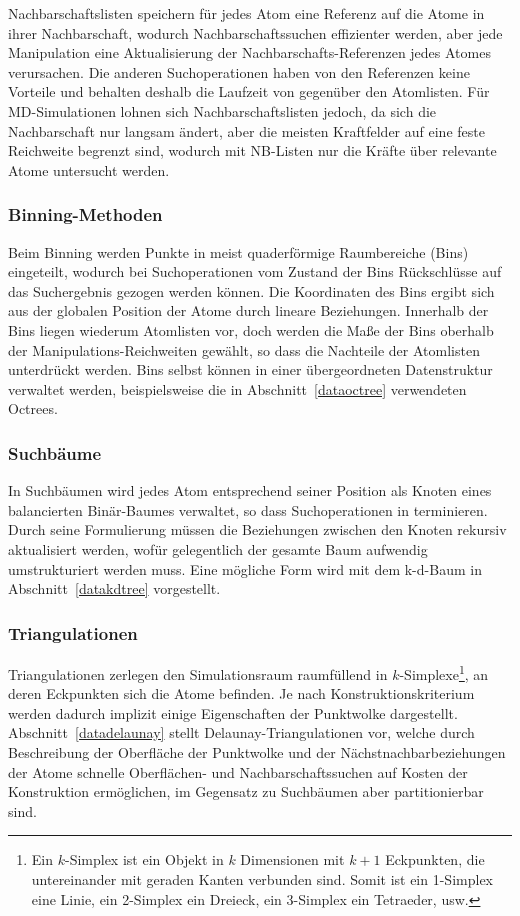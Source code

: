 Nachbarschaftslisten speichern für jedes Atom eine Referenz auf die Atome in ihrer Nachbarschaft, wodurch Nachbarschaftssuchen effizienter werden, aber jede Manipulation eine Aktualisierung der Nachbarschafts-Referenzen jedes Atomes verursachen.
Die anderen Suchoperationen haben von den Referenzen keine Vorteile und behalten deshalb die Laufzeit von  gegenüber den Atomlisten.
Für MD-Simulationen lohnen sich Nachbarschaftslisten jedoch, da sich die Nachbarschaft nur langsam ändert, aber die meisten Kraftfelder auf eine feste Reichweite begrenzt sind, wodurch mit NB-Listen nur die Kräfte über relevante Atome untersucht werden.

\subsubsection{Binning-Methoden}
Beim Binning werden Punkte in meist quaderförmige Raumbereiche (Bins) eingeteilt, wodurch bei Suchoperationen vom Zustand der Bins Rückschlüsse auf das Suchergebnis gezogen werden können.
Die Koordinaten des Bins ergibt sich aus der globalen Position der Atome durch lineare Beziehungen.
Innerhalb der Bins liegen wiederum Atomlisten vor, doch werden die Maße der Bins oberhalb der Manipulations-Reichweiten gewählt, so dass die Nachteile der Atomlisten unterdrückt werden.
Bins selbst können in einer übergeordneten Datenstruktur verwaltet werden, beispielsweise die in Abschnitt~\ref{dataoctree} verwendeten Octrees.

\subsubsection{Suchbäume}
In Suchbäumen wird jedes Atom entsprechend seiner Position als Knoten eines balancierten Binär-Baumes verwaltet, so dass Suchoperationen in  terminieren.
Durch seine Formulierung müssen die Beziehungen zwischen den Knoten rekursiv aktualisiert werden, wofür gelegentlich der gesamte Baum aufwendig umstrukturiert werden muss.
Eine mögliche Form wird mit dem k-d-Baum in Abschnitt~\ref{datakdtree} vorgestellt.

\subsubsection{Triangulationen}
Triangulationen zerlegen den Simulationsraum raumfüllend in $k$-Simplexe\footnote{Ein $k$-Simplex ist ein Objekt in $k$ Dimensionen mit $k+1$ Eckpunkten, die untereinander mit geraden Kanten verbunden sind.
  Somit ist ein 1-Simplex eine Linie, ein 2-Simplex ein Dreieck, ein 3-Simplex ein Tetraeder, usw.}, an deren Eckpunkten sich die Atome befinden.
Je nach Konstruktionskriterium werden dadurch implizit einige Eigenschaften der Punktwolke dargestellt.
Abschnitt~\ref{datadelaunay} stellt Delaunay-Triangulationen vor, welche durch Beschreibung der Oberfläche der Punktwolke und der Nächstnachbarbeziehungen der Atome schnelle Oberflächen- und Nachbarschaftssuchen auf Kosten der Konstruktion ermöglichen, im Gegensatz zu Suchbäumen aber partitionierbar sind.

